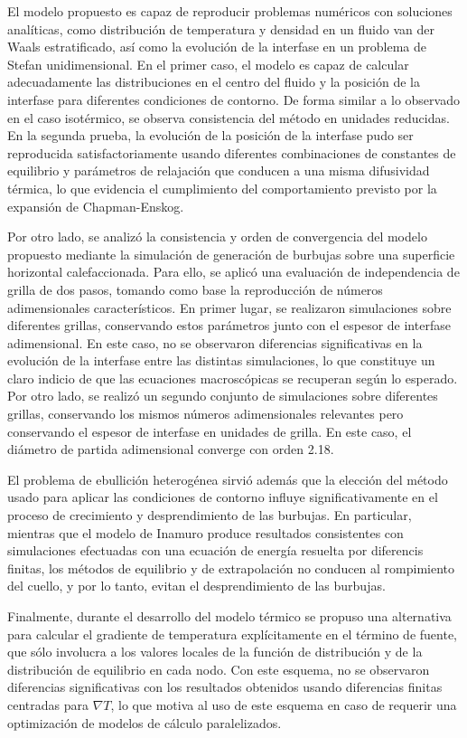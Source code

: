 El modelo propuesto es capaz de reproducir problemas num\'ericos con soluciones anal\'iticas, como distribuci\'on de temperatura y densidad en un fluido van der Waals estratificado, as\'i como la evoluci\'on de la interfase en un problema de Stefan unidimensional. En el primer caso, el modelo es capaz de calcular adecuadamente las distribuciones en el centro del fluido y la posici\'on de la interfase para diferentes condiciones de contorno. De forma similar a lo observado en el caso isot\'ermico, se observa consistencia del m\'etodo en unidades reducidas. En la segunda prueba, la evoluci\'on de la posici\'on de la interfase pudo ser reproducida satisfactoriamente usando diferentes combinaciones de constantes de equilibrio y par\'ametros de relajaci\'on que conducen a una misma difusividad t\'ermica, lo que evidencia el cumplimiento del comportamiento previsto por la expansi\'on de Chapman-Enskog.

Por otro lado, se analiz\'o la consistencia y orden de convergencia del modelo propuesto mediante la simulaci\'on de generaci\'on de burbujas sobre una superficie horizontal calefaccionada. Para ello, se aplic\'o una evaluaci\'on de independencia de grilla de dos pasos, tomando como base la reproducci\'on de n\'umeros adimensionales caracter\'isticos. En primer lugar, se realizaron simulaciones sobre diferentes grillas, conservando estos par\'ametros junto con el espesor de interfase adimensional. En este caso, no se observaron diferencias significativas en la evoluci\'on de la interfase entre las distintas simulaciones, lo que constituye un claro indicio de que las ecuaciones macrosc\'opicas se recuperan seg\'un lo esperado. Por otro lado, se realiz\'o un segundo conjunto de simulaciones sobre diferentes grillas, conservando los mismos n\'umeros adimensionales relevantes pero conservando el espesor de interfase en unidades de grilla. En este caso, el di\'ametro de partida adimensional converge con orden 2.18.

El problema de ebullici\'on heterog\'enea sirvi\'o adem\'as que la elecci\'on del m\'etodo usado para aplicar las condiciones de contorno influye significativamente en el proceso de crecimiento y desprendimiento de las burbujas. En particular, mientras que el modelo de Inamuro produce resultados consistentes con simulaciones efectuadas con una ecuaci\'on de energ\'ia resuelta por diferencis finitas, los m\'etodos de equilibrio y de extrapolaci\'on no conducen al rompimiento del cuello, y por lo tanto, evitan el desprendimiento de las burbujas. 

Finalmente, durante el desarrollo del modelo t\'ermico se propuso una alternativa para calcular el gradiente de temperatura expl\'icitamente en el t\'ermino de fuente, que s\'olo involucra a los valores locales de la funci\'on de distribuci\'on y de la distribuci\'on de equilibrio en cada nodo. Con este esquema, no se observaron diferencias significativas con los resultados obtenidos usando diferencias finitas centradas para $\nabla T$, lo que motiva al uso de este esquema en caso de requerir una optimizaci\'on de modelos de c\'alculo paralelizados.
